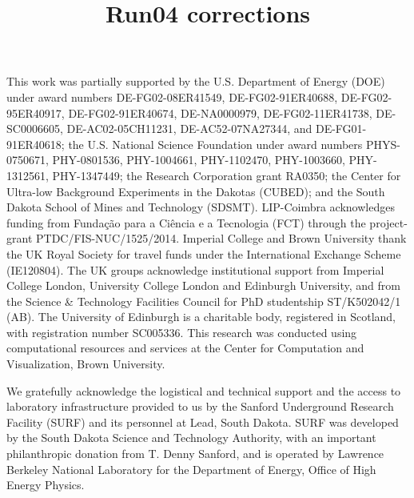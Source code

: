 \documentclass[twocolumn,superscriptaddress,prd]{revtex4-1}
\begin{document}
\title{Run04 corrections}





		\maketitle










\appendix

%


\begin{acknowledgments}

This work was partially supported by the U.S. Department of Energy (DOE) under award numbers DE-FG02-08ER41549, DE-FG02-91ER40688, DE-FG02-95ER40917, DE-FG02-91ER40674, DE-NA0000979, DE-FG02-11ER41738, DE-SC0006605, DE-AC02-05CH11231, DE-AC52-07NA27344, and DE-FG01-91ER40618; the U.S. National Science Foundation under award numbers PHYS-0750671, PHY-0801536, PHY-1004661, PHY-1102470, PHY-1003660, PHY-1312561, PHY-1347449; the Research Corporation grant RA0350; the Center for Ultra-low Background Experiments in the Dakotas (CUBED); and the South Dakota School of Mines and Technology (SDSMT). LIP-Coimbra acknowledges funding from Funda\c{c}\~{a}o para a Ci\^{e}ncia e a Tecnologia (FCT)   through the project-grant PTDC/FIS-NUC/1525/2014. Imperial College and Brown University thank the UK Royal Society for travel funds under the International Exchange Scheme (IE120804). The UK groups acknowledge institutional support from Imperial College London, University College London and Edinburgh University, and from the Science \& Technology Facilities Council for PhD studentship ST/K502042/1 (AB). The University of Edinburgh is a charitable body, registered in Scotland, with registration number SC005336. This research was conducted using computational resources and services at the Center for Computation and Visualization, Brown University.

We gratefully acknowledge the logistical and technical support and the access to laboratory infrastructure provided to us by the Sanford Underground Research Facility (SURF) and its personnel at Lead, South Dakota. SURF was developed by the South Dakota Science and Technology Authority, with an important philanthropic donation from T. Denny Sanford, and is operated by Lawrence Berkeley National Laboratory for the Department of Energy, Office of High Energy Physics.

\end{acknowledgments}


\newpage
\thispagestyle{empty}
\mbox{}
\newpage
\thispagestyle{empty}
\mbox{}

%


\end{document}
